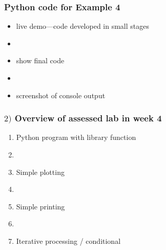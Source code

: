 \documentclass[english,14pt]{beamer}
\begin{document}

\begin{frame}[fragile]

\frametitle{Python code for Example 4}

\begin{itemize}
	\item live demo---code developed in small stages
	\item[]
	\item show final code
	\item[]
	\item screenshot of console output
\end{itemize}
\end{frame}


\begin{frame}[fragile]

\frametitle{$2)$ Overview of assessed lab in week 4}

\begin{enumerate}
	\item Python program with library function
	\item[]
	\item Simple plotting
	\item[]
	\item Simple printing
	\item[]
	\item Iterative processing / conditional
\end{enumerate}

\end{frame}
\end{document}
